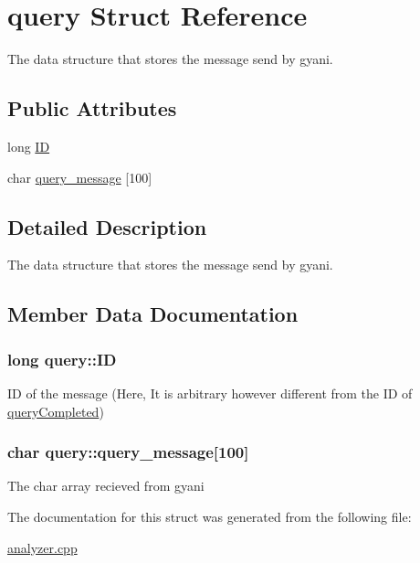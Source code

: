 \hypertarget{structquery}{\section{query \-Struct \-Reference}
\label{structquery}
}


\-The data structure that stores the message send by gyani.  


\subsection*{\-Public \-Attributes}
\begin{DoxyCompactItemize}
\item 
long \hyperlink{structquery_a721014f43d7346adb8fcc51edf6610c9}{\-I\-D}
\item 
char \hyperlink{structquery_af3c901ec57c2b03fa35e3790816fd4c0}{query\-\_\-message} \mbox{[}100\mbox{]}
\end{DoxyCompactItemize}


\subsection{\-Detailed \-Description}
\-The data structure that stores the message send by gyani. 

\subsection{\-Member \-Data \-Documentation}
\hypertarget{structquery_a721014f43d7346adb8fcc51edf6610c9}{
\subsubsection[{\-I\-D}]{\setlength{\rightskip}{0pt plus 5cm}long {\bf query\-::\-I\-D}}}\label{structquery_a721014f43d7346adb8fcc51edf6610c9}
\-I\-D of the message (\-Here, \-It is arbitrary however different from the \-I\-D of \hyperlink{structqueryCompleted}{query\-Completed}) \hypertarget{structquery_af3c901ec57c2b03fa35e3790816fd4c0}{
\subsubsection[{query\-\_\-message}]{\setlength{\rightskip}{0pt plus 5cm}char {\bf query\-::query\-\_\-message}\mbox{[}100\mbox{]}}}\label{structquery_af3c901ec57c2b03fa35e3790816fd4c0}
\-The char array recieved from gyani 

\-The documentation for this struct was generated from the following file\-:\begin{DoxyCompactItemize}
\item 
\hyperlink{analyzer_8cpp}{analyzer.\-cpp}\end{DoxyCompactItemize}
